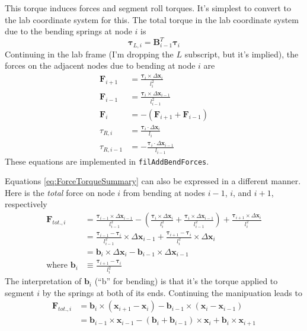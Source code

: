 \documentclass {scrbook}
\newcommand {\ttt} {\texttt}
\begin{document}
This torque induces forces and segment roll torques. It's simplest to convert to the lab coordinate system for this. The total torque in the lab coordinate system due to the bending springs at node $i$ is
\begin{equation}
\bm{\tau}_{L,i} = \bm{B}^T_{i-1}\bm{\tau}_i
\label{eq:LabFrameTorque}
\end{equation}
Continuing in the lab frame (I'm dropping the $L$ subscript, but it's implied), the forces on the adjacent nodes due to bending at node $i$ are
\begin{align}
\bm{F}_{i+1} &= \frac{\bm{\tau}_i \times \Delta \bm{x}_i}{l_i^2} \nonumber \\
\bm{F}_{i-1} &= \frac{\bm{\tau}_i \times \Delta \bm{x}_{i-1}}{l_{i-1}^2} \nonumber \\
\bm{F}_i &= - (\bm{F}_{i+1} + \bm{F}_{i-1}) \nonumber \\
\tau_{R,i} &= \frac{\bm{\tau}_i \cdot \Delta \bm{x}_i }{l_i} \nonumber \\
\tau_{R,i-1} &= - \frac{\bm{\tau}_i \cdot \Delta \bm{x}_{i-1}}{l_{i-1}}
\label{eq:ForceTorqueSummary}
\end{align}
These equations are implemented in \ttt{filAddBendForces}.

Equations \ref{eq:ForceTorqueSummary} can also be expressed in a different manner. Here is the \textit{total} force on node $i$ from bending at nodes $i-1$, $i$, and $i+1$, respectively
\begin{align}
\label{eq:BendForceTotalVector1}
\bm{F}_{tot.,i} &= \frac{\bm{\tau}_{i-1} \times \Delta \bm{x}_{i-1}}{l_{i-1}^2} -\left( \frac{\bm{\tau}_i \times \Delta \bm{x}_i}{l_i^2} + \frac{\bm{\tau}_i \times \Delta \bm{x}_{i-1}}{l_{i-1}^2} \right) + \frac{\bm{\tau}_{i+1} \times \Delta \bm{x}_{i}}{l_i^2} \\
&= \frac{\bm{\tau}_{i-1} - \bm{\tau}_i }{l_{i-1}^2} \times \Delta \bm{x}_{i-1} + \frac{\bm{\tau}_{i+1} - \bm{\tau}_i}{l_i^2} \times \Delta \bm{x}_{i} \nonumber \\
&= \bm{b}_i \times \Delta \bm{x}_{i} - \bm{b}_{i-1} \times \Delta \bm{x}_{i-1} \nonumber \\
\textrm{where } \bm{b}_i &\equiv \frac{\bm{\tau}_{i+1} - \bm{\tau}_i}{l_i^2} \nonumber
\end{align}
The interpretation of $\bm{b}_i$ (``b'' for bending) is that it's the torque applied to segment $i$ by the springs at both of its ends. Continuing the manipuation leads to
\begin{align}
\bm{F}_{tot.,i} &= \bm{b}_i \times (\bm{x}_{i+1} - \bm{x}_i) - \bm{b}_{i-1} \times (\bm{x}_i - \bm{x}_{i-1}) \nonumber \\
\label{eq:BendForceTotalVector}
&= \bm{b}_{i-1} \times \bm{x}_{i-1} - (\bm{b}_i + \bm{b}_{i-1}) \times \bm{x}_i + \bm{b}_i \times \bm{x}_{i+1}
\end{align}
\end{document}
